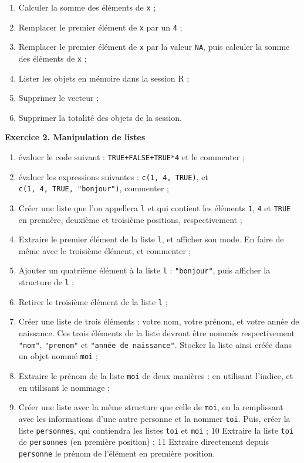 \documentclass[
  11pt,
]{book}
\makeatletter
\providecommand{\tightlist}{%
  \setlength{\itemsep}{0pt}\setlength{\parskip}{0pt}}
\numberwithin{equation}{section}
\numberwithin{countremarque}{section}
\newenvironment{exframe}{%
 \def\at@end@of@exframe{}%
 \ifinner\ifhmode%
  \def\at@end@of@exframe{\end{minipage}}%
  \begin{minipage}{\columnwidth}%
 \fi\fi%
 \def\FrameCommand##1{\hskip\@totalleftmargin \hskip-\fboxsep
 \colorbox{shadecolorex}{##1}\hskip-\fboxsep
     \hskip-\linewidth \hskip-\@totalleftmargin \hskip\columnwidth}%
 \MakeFramed {\advance\hsize-\width
   \@totalleftmargin\z@ \linewidth\hsize
   \@setminipage}}%
 {\par\unskip\endMakeFramed%
 \at@end@of@exframe}
\makeatother
\begin{document}
\begin{exframe}
\begin{enumerate}
\item
  Calculer la somme des éléments de \texttt{x} ;
\item
  Remplacer le premier élément de \texttt{x} par un \texttt{4} ;
\item
  Remplacer le premier élément de \texttt{x} par la valeur \texttt{NA}, puis calculer la somme des éléments de \texttt{x} ;
\item
  Lister les objets en mémoire dans la session R ;
\item
  Supprimer le vecteur ;
\item
  Supprimer la totalité des objets de la session.
\end{enumerate}
\end{exframe}

\begin{exframe}
\textbf{Exercice 2. Manipulation de listes}

\begin{enumerate}
\def\labelenumi{\arabic{enumi}.}
\tightlist
\item
  évaluer le code suivant : \texttt{TRUE+FALSE+TRUE*4} et le commenter ;
\item
  évaluer les expressions suivantes : \texttt{c(1,\ 4,\ TRUE)}, et \texttt{c(1,\ 4,\ TRUE,\ "bonjour")}, commenter ;
\item
  Créer une liste que l'on appellera \texttt{l} et qui contient les éléments \texttt{1}, \texttt{4} et \texttt{TRUE} en première, deuxième et troisième positions, respectivement ;
\item
  Extraire le premier élément de la liste \texttt{l}, et afficher son mode. En faire de même avec le troisième élément, et commenter ;
\item
  Ajouter un quatrième élément à la liste \texttt{l} : \texttt{"bonjour"}, puis afficher la structure de \texttt{l} ;
\item
  Retirer le troisième élément de la liste \texttt{l} ;
\item
  Créer une liste de trois éléments : votre nom, votre prénom, et votre année de naissance. Ces trois éléments de la liste devront être nommés respectivement \texttt{"nom"}, \texttt{"prenom"} et \texttt{"année\ de\ naissance"}. Stocker la liste ainsi créée dans un objet nommé \texttt{moi} ;
\item
  Extraire le prénom de la liste \texttt{moi} de deux manières : en utilisant l'indice, et en utilisant le nommage ;
\item
  Créer une liste avec la même structure que celle de \texttt{moi}, en la remplissant avec les informations d'une autre personne et la nommer \texttt{toi}. Puis, créer la liste \texttt{personnes}, qui contiendra les listes \texttt{toi} et \texttt{moi} ;
  10 Extraire la liste \texttt{toi} de \texttt{personnes} (en première position) ;
  11 Extraire directement depuis \texttt{personne} le prénom de l'élément en première position.
\end{enumerate}
\end{exframe}
\end{document}
